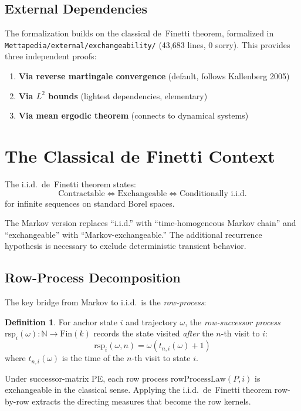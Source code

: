 \documentclass[11pt,a4paper]{article}
\theoremstyle{definition}
\newtheorem{definition}{Definition}[section]
\begin{document}
\subsection{External Dependencies}

The formalization builds on the classical de~Finetti theorem, formalized in
\texttt{Mettapedia/external/exchangeability/} (43,683 lines, 0 sorry). This
provides three independent proofs:

\begin{enumerate}
\item \textbf{Via reverse martingale convergence} (default, follows Kallenberg 2005)
\item \textbf{Via $L^2$ bounds} (lightest dependencies, elementary)
\item \textbf{Via mean ergodic theorem} (connects to dynamical systems)
\end{enumerate}

\section{The Classical de Finetti Context}

The i.i.d.\ de~Finetti theorem states:
\[
\text{Contractable} \iff \text{Exchangeable} \iff \text{Conditionally i.i.d.}
\]
for infinite sequences on standard Borel spaces.

The Markov version replaces ``i.i.d.'' with ``time-homogeneous Markov chain''
and ``exchangeable'' with ``Markov-exchangeable.'' The additional recurrence
hypothesis is necessary to exclude deterministic transient behavior.

\subsection{Row-Process Decomposition}

The key bridge from Markov to i.i.d.\ is the \emph{row-process}:

\begin{definition}
For anchor state $i$ and trajectory $\omega$, the \emph{row-successor process}
$\mathrm{rsp}_i(\omega) : \mathbb{N} \to \mathrm{Fin}(k)$ records the state
visited \emph{after} the $n$-th visit to $i$:
\[
\mathrm{rsp}_i(\omega, n) = \omega(t_{n,i}(\omega) + 1)
\]
where $t_{n,i}(\omega)$ is the time of the $n$-th visit to state $i$.
\end{definition}

Under successor-matrix PE, each row process
$\mathrm{rowProcessLaw}(P, i)$ is exchangeable in the classical sense.
Applying the i.i.d.\ de~Finetti theorem row-by-row extracts the directing
measures that become the row kernels.
\end{document}
